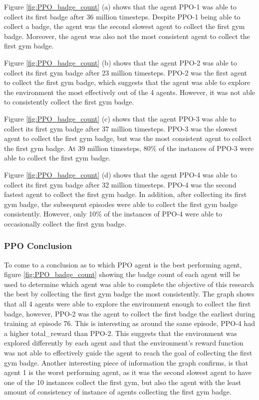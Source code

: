 Figure \ref{fig:PPO_badge_count} (a) shows that the agent PPO-1 was able to collect its first badge after 36 million timesteps. Despite PPO-1 being able to collect a badge, the agent was the second slowest agent to collect the first gym badge. Moreover, the agent was also not the most consistent agent to collect the first gym badge.

Figure \ref{fig:PPO_badge_count} (b) shows that the agent PPO-2 was able to collect its first gym badge after 23 million timesteps. PPO-2 was the first agent to collect the first gym badge, which suggests that the agent was able to explore the environment the most effectively out of the 4 agents. However, it was not able to consistently collect the first gym badge.

Figure \ref{fig:PPO_badge_count} (c) shows that the agent PPO-3 was able to collect its first gym badge after 37 million timesteps. PPO-3 was the slowest agent to collect the first gym badge, but was the most consistent agent to collect the first gym badge. At 39 million timesteps, 80\% of the instances of PPO-3 were able to collect the first gym badge.

Figure \ref{fig:PPO_badge_count} (d) shows that the agent PPO-4 was able to collect its first gym badge after 32 million timesteps. PPO-4 was the second fastest agent to collect the first gym badge. In addition, after collecting its first gym badge, the subsequent episodes were able to collect the first gym badge consistently. However, only 10\% of the instances of PPO-4 were able to occasionally collect the first gym badge.

\subsubsection*{PPO Conclusion} 

To come to a conclusion as to which PPO agent is the best performing agent, figure \ref{fig:PPO_badge_count} showing the badge count of each agent will be used to determine which agent was able to complete the objective of this research the best by collecting the first gym badge the most consistently. The graph shows that all 4 agents were able to explore the environment enough to collect the first badge, however, PPO-2 was the agent to collect the first badge the earliest during training at episode 76. This is interesting as around the same episode, PPO-4 had a higher total\_reward than PPO-2. This suggests that the environment was explored differently by each agent and that the environment's reward function was not able to effectively guide the agent to reach the goal of collecting the first gym badge. Another interesting piece of information the graph confirms, is that agent 1 is the worst performing agent, as it was the second slowest agent to have one of the 10 instances collect the first gym, but also the agent with the least amount of consistency of instance of agents collecting the first gym badge. 

